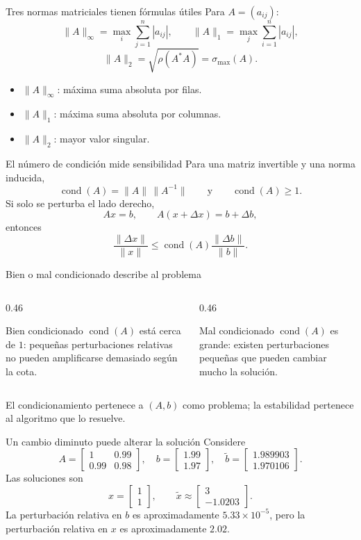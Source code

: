 \documentclass[aspectratio=169,12pt]{beamer}
\newcommand{\mat}[1]{\begin{bmatrix}#1\end{bmatrix}}
\DeclareMathOperator{\cond}{cond}
\begin{document}
\begin{frame}{Tres normas matriciales tienen fórmulas útiles}
Para $A=(a_{ij})$:
\[
\|A\|_\infty=\max_i\sum_{j=1}^{n}|a_{ij}|,
\qquad
\|A\|_1=\max_j\sum_{i=1}^{n}|a_{ij}|,
\]
\[
\|A\|_2=\sqrt{\rho(A^*A)}=\sigma_{\max}(A).
\]
\begin{itemize}
  \item $\|A\|_\infty$: máxima suma absoluta por filas.
  \item $\|A\|_1$: máxima suma absoluta por columnas.
  \item $\|A\|_2$: mayor valor singular.
\end{itemize}
\end{frame}

\begin{frame}{El número de condición mide sensibilidad}
Para una matriz invertible y una norma inducida,
\[
\boxed{\cond(A)=\|A\|\,\|A^{-1}\|}\qquad\text{y}\qquad\cond(A)\geq1.
\]
Si solo se perturba el lado derecho,
\[
Ax=b,\qquad A(x+\Delta x)=b+\Delta b,
\]
entonces
\[
\frac{\|\Delta x\|}{\|x\|}
\leq
\cond(A)\frac{\|\Delta b\|}{\|b\|}.
\]
\end{frame}

\begin{frame}{Bien o mal condicionado describe al problema}
\begin{columns}[T,onlytextwidth]
\begin{column}{0.46\textwidth}
\begin{block}{Bien condicionado}
$\cond(A)$ está cerca de $1$: pequeñas perturbaciones relativas no pueden
amplificarse demasiado según la cota.
\end{block}
\end{column}
\begin{column}{0.46\textwidth}
\begin{block}{Mal condicionado}
$\cond(A)$ es grande: existen perturbaciones pequeñas que pueden cambiar mucho
la solución.
\end{block}
\end{column}
\end{columns}
\vspace{0.45cm}
\centering
El condicionamiento pertenece a $(A,b)$ como problema; la estabilidad pertenece
al algoritmo que lo resuelve.
\end{frame}

\begin{frame}{Un cambio diminuto puede alterar la solución}
Considere
\[
A=\mat{1&0.99\\0.99&0.98},\quad
b=\mat{1.99\\1.97},\quad
\widetilde b=\mat{1.989903\\1.970106}.
\]
Las soluciones son
\[
x=\mat{1\\1},
\qquad
\widetilde x\approx\mat{3\\-1.0203}.
\]
La perturbación relativa en $b$ es aproximadamente $5.33\times10^{-5}$,
pero la perturbación relativa en $x$ es aproximadamente $2.02$.
\end{frame}
\end{document}
